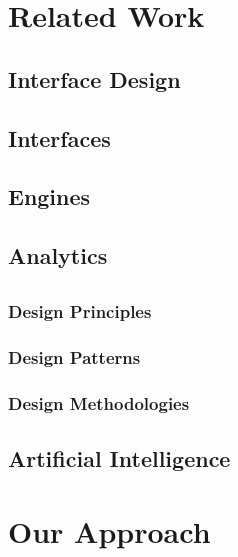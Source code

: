 \documentclass[12pt]{report}
\begin{document}
\newpage
\chapter{Related Work}
\section{ Interface Design}
\section{ Interfaces}
\section{ Engines}
\section{ Analytics }
\section{  }
\subsection{ Design Principles }
\subsection{ Design Patterns}
\subsection{ Design Methodologies }
\section{ Artificial Intelligence }


\newpage
\chapter{Our Approach}


\newpage
\end{document}

